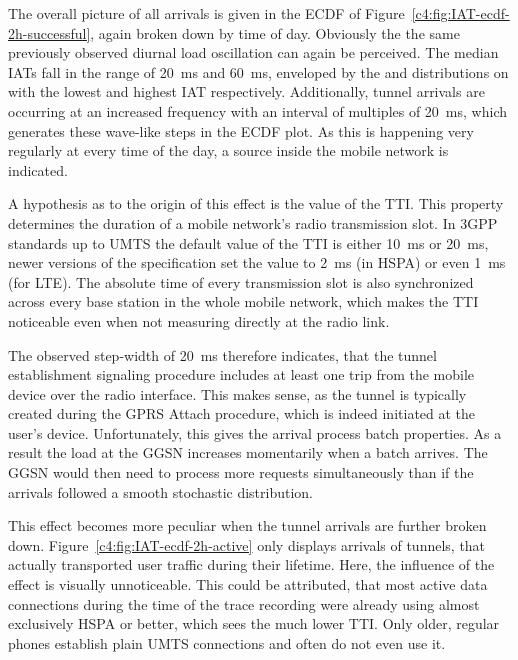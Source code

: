The overall picture of all arrivals is given in the \gls{ECDF} of Figure~\ref{c4:fig:IAT-ecdf-2h-successful}, again broken down by time of day. Obviously the the same previously observed diurnal load oscillation can again be perceived. The median \glspl{IAT} fall in the range of \SI{20}{\milli\second} and \SI{60}{\milli\second}, enveloped by the  and distributions on with the lowest and highest \gls{IAT} respectively. Additionally, tunnel arrivals are occurring at an increased frequency with an interval of multiples of \SI{20}{\milli\second}, which generates these wave-like steps in the \gls{ECDF} plot. As this is happening very regularly at every time of the day, a source inside the mobile network is indicated.

A hypothesis as to the origin of this effect is the value of the \gls{TTI}. This property determines the duration of a mobile network's radio transmission slot. In \gls{3GPP} standards up to \gls{UMTS} the default value of the \gls{TTI} is either \SI{10}{\milli\second} or \SI{20}{\milli\second}, newer versions of the specification set the value to \SI{2}{\milli\second} (in \gls{HSPA}) or even \SI{1}{\milli\second} (for \gls{LTE}). The absolute time of every transmission slot is also synchronized across every base station in the whole mobile network, which makes the \gls{TTI} noticeable even when not measuring directly at the radio link. 

The observed step-width of \SI{20}{\milli\second} therefore indicates, that the tunnel establishment signaling procedure includes at least one trip from the mobile device over the radio interface. This makes sense, as the tunnel is typically created during the \gls{GPRS} Attach procedure, which is indeed initiated at the user's device. Unfortunately, this gives the arrival process batch properties. As a result the load at the \gls{GGSN} increases momentarily when a batch arrives. The \gls{GGSN} would then need to process more requests simultaneously than if the arrivals followed a smooth stochastic distribution.

This effect becomes more peculiar when the tunnel arrivals are further broken down. Figure~\ref{c4:fig:IAT-ecdf-2h-active} only displays arrivals of tunnels, that actually transported user traffic during their lifetime. Here, the influence of the effect is visually unnoticeable. This could be attributed, that most active data connections during the time of the trace recording were already using almost exclusively \gls{HSPA} or better, which sees the much lower \gls{TTI}. Only older, regular phones establish plain \gls{UMTS} connections and often do not even use it.


